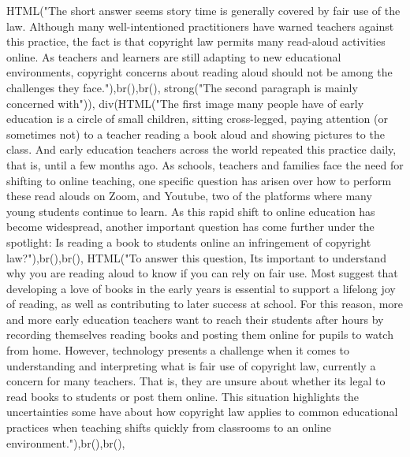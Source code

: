 \documentclass[
]{article}
\newenvironment{Shaded}{\begin{snugshade}}{\end{snugshade}}
\newcommand{\FunctionTok}[1]{\textcolor[rgb]{0.00,0.00,0.00}{#1}}
\newcommand{\NormalTok}[1]{#1}
\newcommand{\StringTok}[1]{\textcolor[rgb]{0.31,0.60,0.02}{#1}}
\begin{document}
\begin{Shaded}
\begin{Highlighting}[]
               \FunctionTok{HTML}\NormalTok{(}\StringTok{"The short answer seems story time is generally covered by fair use of the law. Although many well{-}intentioned practitioners have warned teachers against this practice, the fact is that copyright law permits many read{-}aloud activities online. As teachers and learners are still adapting to new educational environments, copyright concerns about reading aloud should not be among the challenges they face."}\NormalTok{),}\FunctionTok{br}\NormalTok{(),}\FunctionTok{br}\NormalTok{(),}
               \FunctionTok{strong}\NormalTok{(}\StringTok{"The second paragraph is mainly concerned with"}\NormalTok{)),}
           \FunctionTok{div}\NormalTok{(}\FunctionTok{HTML}\NormalTok{(}\StringTok{"The first image many people have of early education is a circle of small children, sitting cross{-}legged, paying attention (or sometimes not) to a teacher reading a book aloud and showing pictures to the class. And early education teachers across the world repeated this practice daily, that is, until a few months ago. As schools, teachers and families face the need for shifting to online teaching, one  specific question has arisen over how to perform these read alouds on Zoom, and Youtube, two of the platforms where many young students continue to learn. As this rapid shift to online education has become widespread, another important question has come further under the spotlight: Is reading a book to students online an infringement of copyright law?"}\NormalTok{),}\FunctionTok{br}\NormalTok{(),}\FunctionTok{br}\NormalTok{(), }
               \FunctionTok{HTML}\NormalTok{(}\StringTok{"To answer this question, Its important to understand why you are reading aloud to know if you can rely on fair use. Most suggest that developing a love of books in the early years is essential to support a lifelong joy of reading, as well as contributing to later success at school. For this reason, more and more early education teachers want to reach their students after hours by recording themselves reading books and posting them online for pupils to watch from home. However, technology presents a challenge when it comes to understanding and interpreting what is fair use of copyright law, currently a concern for many teachers. That is, they are unsure about whether its legal to read books to students or post them online. This situation highlights the uncertainties some have about how copyright law applies to common educational practices when teaching shifts quickly from classrooms to an online environment."}\NormalTok{),}\FunctionTok{br}\NormalTok{(),}\FunctionTok{br}\NormalTok{(), }

\end{Highlighting}
\end{Shaded}
\end{document}
